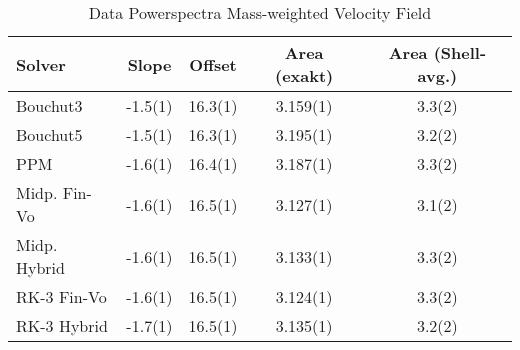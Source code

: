 \begin{table}[H]
\fontsize{3mm}{3mm}\selectfont
\captionsetup{width=.8\textwidth}
\caption{Data Powerspectra Mass-weighted Velocity Field}
\centering
\begin{tabular}{lcccc}
\toprule
Solver & Slope & Offset & Area (exakt) & Area (Shell-avg.) \\
\midrule
Bouchut3 	     & -1.5(1) & 16.3(1) & 3.159(1) & 3.3(2) \\
Bouchut5 	     & -1.5(1) & 16.3(1) & 3.195(1) & 3.2(2) \\
PPM 	         & -1.6(1) & 16.4(1) & 3.187(1) & 3.3(2) \\
Midp. Fin-Vo 	 & -1.6(1) & 16.5(1) & 3.127(1) & 3.1(2) \\
Midp. Hybrid 	 & -1.6(1) & 16.5(1) & 3.133(1) & 3.3(2) \\
RK-3  Fin-Vo 	 & -1.6(1) & 16.5(1) & 3.124(1) & 3.3(2) \\
RK-3  Hybrid 	 & -1.7(1) & 16.5(1) & 3.135(1) & 3.2(2) \\
\bottomrule
\end{tabular}
\label{tab:pws-rmsv-mw}
\end{table}


